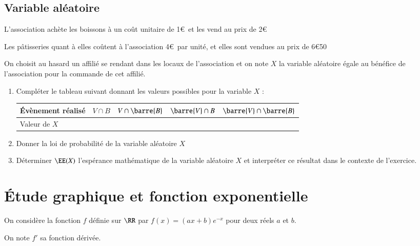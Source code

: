 \documentclass[oneside,12pt]{article}
\begin{document}
\subsection{Variable aléatoire}
L'association achète les boissons à un coût unitaire de 1\euro\, et les vend au prix de 2\euro

Les pâtisseries quant à elles coûtent à l'association 4\euro\, par unité, et elles sont vendues au prix de 6\euro50

On choisit au hasard un affilié se rendant dans les locaux de l'association et on note $X$ la variable aléatoire égale au bénéfice de l'association pour la commande de cet affilié.

\begin{enumerate}
	\item Compléter le tableau suivant donnant les valeurs possibles pour la variable $X$ :
		\begin{center}
			\renewcommand{\arraystretch}{1.5}
			\begin{tabular}{|P{4cm}|P{2cm}|P{2cm}|P{2cm}|P{2cm}|}\hline
				Évènement réalisé & $V\cap B$ & $V \cap \barre{B}$ & $\barre{V} \cap B$ & $\barre{V} \cap \barre{B}$ \\ \hline
				Valeur de $X$ &  &  &  &  \\ \hline
			\end{tabular}
		\end{center}
	\item Donner la loi de probabilité de la variable aléatoire $X$
	\item Déterminer $\EE(X)$ l'espérance mathématique de la variable aléatoire $X$ et interpréter ce résultat dans le contexte de l'exercice.
\end{enumerate}



\section{Étude graphique et fonction exponentielle}
On considère la fonction $f$ définie sur $\RR$ par $f(x)=(ax+b)e^{-x}$ pour deux réels $a$ et $b$.

On note $f'$ sa fonction dérivée.
\end{document}
